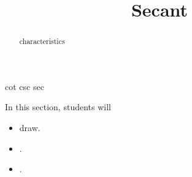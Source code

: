 \documentclass{ximera}
\title{Secant}
\begin{document}
\begin{abstract}
characteristics
\end{abstract}
\maketitle



cot csc sec

\begin{sectionOutcomes}
In this section, students will 

\begin{itemize}
\item draw.
\item .
\item .
\end{itemize}
\end{sectionOutcomes}
\end{document}
